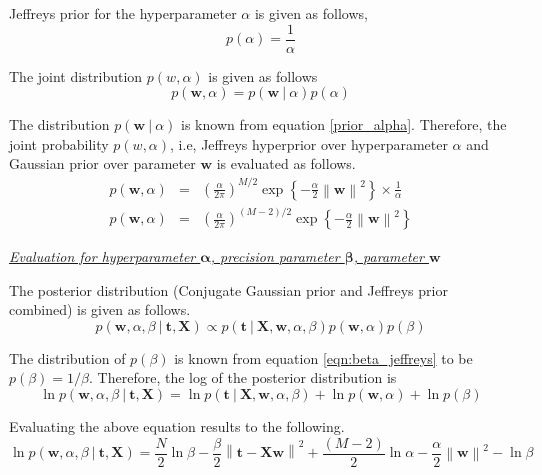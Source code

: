 \documentclass[11pt]{article}
\newcommand\given[1][]{\:#1\vert\:}
\newcommand{\norm}[1]{\left\lVert#1\right\rVert}
\begin{document}
Jeffreys prior for the hyperparameter $\alpha$ is given as follows,
\begin{equation} \label{eqn:alpha_jeffreys}
    p(\alpha) = \frac{1}{\alpha}
\end{equation}

The joint distribution $p(w,\alpha)$ is given as follows
\begin{equation} \label{eqn:joint_alpha}
    p(\bm{w}, \alpha) = p(\bm{w} \given \alpha)p(\alpha)
\end{equation}

The distribution $p(\bm{w} \given \alpha)$ is known from equation \ref{prior_alpha}. Therefore, the joint probability $p(w, \alpha)$, i.e, Jeffreys hyperprior over hyperparameter $\alpha$ and Gaussian prior over parameter $\bm{w}$ is evaluated as follows.
\begin{eqnarray}
    p(\bm{w}, \alpha) 
    &=&
    \left( \frac{\alpha}{2\pi}\right)^{M/2} \exp{\left\{ -\frac{\alpha}{2}\norm{\bm{w}}^2\right\}} \times \frac{1}{\alpha} \\
    p(\bm{w}, \alpha) 
    &=& 
    \left( \frac{\alpha}{2\pi}\right)^{\left( M-2\right)/2} \exp{\left\{ -\frac{\alpha}{2}\norm{\bm{w}}^2\right\}}
\end{eqnarray}

\vspace{5mm}
\textit{\underline{Evaluation for hyperparameter $\bm{\alpha}$, precision parameter $\bm{\beta}$, parameter $\bm{w}$}}
\vspace{5mm}

The posterior distribution (Conjugate Gaussian prior and Jeffreys prior combined) is given as follows.
\begin{equation}
    p(\bm{w}, \alpha, \beta \given \bm{t}, \bm{X}) \propto p(\bm{t} \given \bm{X}, \bm{w}, \alpha, \beta) p(\bm{w}, \alpha) p(\beta)
\end{equation}

The distribution of $p(\beta)$ is known from equation \ref{eqn:beta_jeffreys} to be $p(\beta) = 1/\beta$. Therefore, the log of the posterior distribution is
\begin{equation}
    \ln{p(\bm{w}, \alpha, \beta \given \bm{t}, \bm{X})} = \ln{p(\bm{t} \given \bm{X}, \bm{w}, \alpha, \beta)} + \ln{p(\bm{w}, \alpha)} + \ln{p(\beta)}
\end{equation}

Evaluating the above equation results to the following.
\begin{equation} \label{eqn:log_posterior_alpha}
    \ln{p(\bm{w}, \alpha, \beta \given \bm{t}, \bm{X})} = \frac{N}{2}\ln{\beta}  - \frac{\beta}{2} \norm{\bm{t} - \bm{Xw}}^2 + \frac{\left(M-2\right)}{2} \ln{\alpha} - \frac{\alpha}{2}\norm{\bm{w}}^2 - \ln{\beta}
\end{equation}
\end{document}
